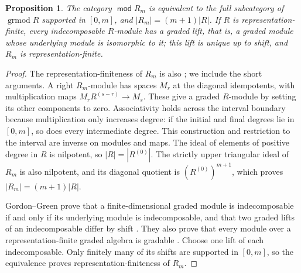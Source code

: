 \documentclass[a4paper,reqno,10pt]{amsart}
\newtheorem{proposition}[theorem]{Proposition}
\theoremstyle{definition}
\numberwithin{equation}{section}
\DeclareMathOperator{\moduleCategory}{\mathsf{mod}}
\renewcommand{\mod}{\moduleCategory}
\begin{document}
\begin{proposition}\label{prop:interval-modules}
The category \(\mod R_m\) is equivalent to the full subcategory of
\(\operatorname{grmod}R\) supported in \([0,m]\), and
\(|R_m|=(m+1)|R|\).
If \(R\) is representation-finite, every indecomposable \(R\)-module
has a graded lift, that is, a graded module whose underlying module is
isomorphic to it; this lift is unique up to shift, and \(R_m\) is
representation-finite.
\end{proposition}
\begin{proof}
The representation-finiteness of \(R_m\) is also
\cite[Proposition~1.1]{GG2}; we include the short arguments.
A right \(R_m\)-module has spaces \(M_r\) at the diagonal idempotents,
with multiplication maps \(M_rR^{(s-r)}\to M_s\). These give a graded
\(R\)-module by setting its other components to zero. Associativity
holds across the interval boundary because multiplication only increases
degree: if the initial and final degrees lie in \([0,m]\), so does
every intermediate degree. This construction and restriction to the
interval are inverse on modules and maps.
The ideal of elements of positive degree in \(R\) is nilpotent, so
\(|R|=|R^{(0)}|\). The strictly upper triangular ideal of \(R_m\) is
also nilpotent, and its diagonal quotient is \((R^{(0)})^{m+1}\),
which proves \(|R_m|=(m+1)|R|\).

Gordon--Green prove that a finite-dimensional graded module is
indecomposable if and only if its underlying module is indecomposable,
and that two graded lifts of an indecomposable differ by shift
\cite[Theorems~3.2 and~4.1]{GG1}. They also prove that every module over a
representation-finite graded algebra is gradable
\cite[Theorem~4.3]{GG2}. Choose one lift of each indecomposable.
Only finitely many of its shifts are supported in \([0,m]\), so the equivalence
proves representation-finiteness of \(R_m\).
\end{proof}
\end{document}
